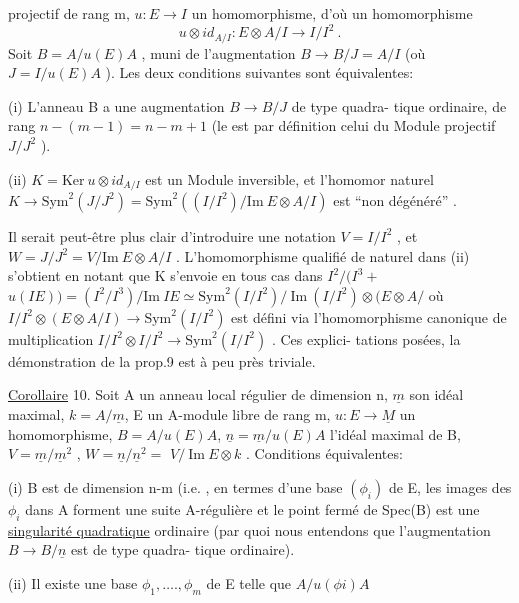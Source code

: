 
projectif de rang m,  $u{:}E \to I$ un homomorphisme, d'où un homomorphisme
\[ u\otimes id_{A/I} : E\otimes A/I \longrightarrow I/I^2 \ . \]
 Soit $B = A/u(E)A$ , muni de l'augmentation $B\to B/J = A/I$
(où $J = I/u(E)A$ ). Les deux conditions suivantes sont équivalentes:

\placedmargin{$\|$} (i) L'anneau  B  a une augmentation $B\to B/J$ de type quadra-%
tique ordinaire, de rang $n-(m-1)= n-m+1$ (le 
est par définition celui du Module projectif $J/J^2$ ).

\placedmargin{$|$} (ii) $K = \mathrm{Ker}\ u\otimes id_{A/I}$ est un Module inversible, et l'homomor
 naturel $K \longrightarrow \mathrm{Sym}^2(J/J^2) = \mathrm{Sym}^2( (I/I^2)/\mathrm{Im}\ E\otimes A/I )$ est
``non dégénéré'' .

Il serait peut-être plus clair d'introduire une notation $V = I/I^2$ ,
et $W = J/J^2 = V / \mathrm{Im}\ E\otimes A/I$ . L'homomorphisme qualifié de naturel
dans (ii) s'obtient en notant que K s'envoie en tous cas dans
\placedmargin{$|$} $I^2/(I^3 +$  $u(IE)) = (I^2/I^3)/\mathrm{Im}\ IE \simeq \mathrm{Sym}^2(I/I^2)/\ \mathrm{Im}\ (I/I^2)\otimes(E\otimes A/$
où $I/I^2 \otimes(E \otimes A/I) \to \mathrm{Sym}^2(I/I^2)$ est défini via l'homomorphisme
canonique de multiplication $I/I^2 \otimes I/I^2 \to \mathrm{Sym}^2(I/I^2 )$ . Ces explici-%
tations posées, la démonstration de la prop.9 est à peu près triviale.

\uline{Corollaire} 10. Soit A un anneau local régulier de dimension n, $\underline{m}$ son
idéal maximal, $k=A/\underline{m}$, E un A-module libre de rang m, $u{:}E \to \underline{M}$ un homomorphisme,
 $B = A/u(E)A$, $\underline{n} = \underline{m}/u(E)A$ l'idéal maximal de B,
$V = \underline{m}/\underline{m}^2$ , $W = \underline{n}/\underline{n}^2 =$  $V/\ \mathrm{Im}\ E\otimes k$ . Conditions équivalentes:

 (i) B est de dimension n-m (i.e. , en termes d'une base  $(\phi_i)$ de
\placedmargin{$\|$} E, les images des $\phi_i$ dans A forment une suite A-régulière et  le
 point fermé de Spec(B) est une \uline{singularité quadratique}
ordinaire (par quoi nous entendons que l'augmentation $B\to B/\underline{n}$ est de type quadra-%
tique ordinaire).

(ii) Il existe une base $\phi_1 ,\ldots., \phi_m$ de E telle que \hand{\unsure{$\sqrt{\ }$}}$A/$$u(\phi i)A$

